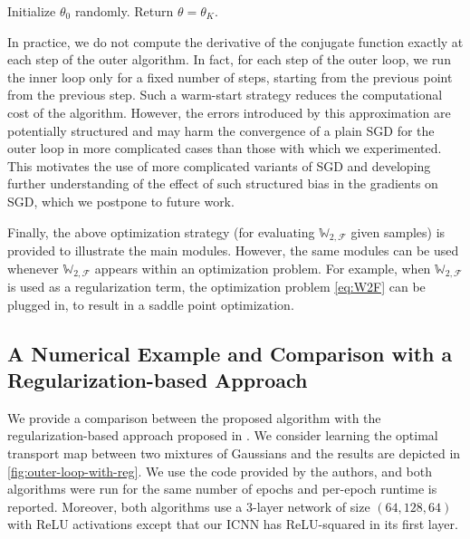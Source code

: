 \documentclass[10pt]{article}
\newcommand{\W}{\mathds{W}}
\newcommand{\calF}{\mathcal{F}}
\numberwithin{equation}{section}
\begin{document}
\begin{algorithm}%
	Initialize $\theta_0$ randomly. 
	Return $\theta=\theta_K$.
	\caption{Projected SGD with an exact conjugate oracle; the outer loop.}
\end{algorithm}

In practice, we do not compute the derivative of the conjugate function exactly at each step of the outer algorithm. In fact, for each step of the outer loop, we run the inner loop only for a fixed number of steps, starting from the previous point from the previous step. Such a warm-start strategy reduces the computational cost of the algorithm. However, the errors introduced by this approximation are potentially structured and may harm the convergence of a plain SGD for the outer loop in more complicated cases than those with which we experimented. This motivates the use of more complicated variants of SGD and developing further understanding of the effect of such structured bias in the gradients on SGD, which we postpone to future work. 

Finally, the above optimization strategy (for evaluating $\W_{2,\calF}$ given samples) is provided to illustrate the main modules. However, the same modules can be used whenever $\W_{2,\calF}$ appears within an optimization problem. For example, when $\W_{2,\calF}$ is used as a regularization term, the optimization problem \eqref{eq:W2F} can be plugged in, to result in a saddle point optimization. 


\subsection{A Numerical Example and Comparison with a Regularization-based Approach}
We provide a comparison between the proposed algorithm with the regularization-based approach proposed in \citet{seguy2017large}. We consider learning the optimal transport map between two mixtures of Gaussians and the results are depicted in \autoref{fig:outer-loop-with-reg}. We use the code provided by the authors, and both algorithms were run for the same number of epochs and per-epoch runtime is reported. Moreover, both algorithms use a 3-layer network of size $(64,128,64)$ with ReLU activations except that our ICNN has ReLU-squared in its first layer. 
\end{document}
